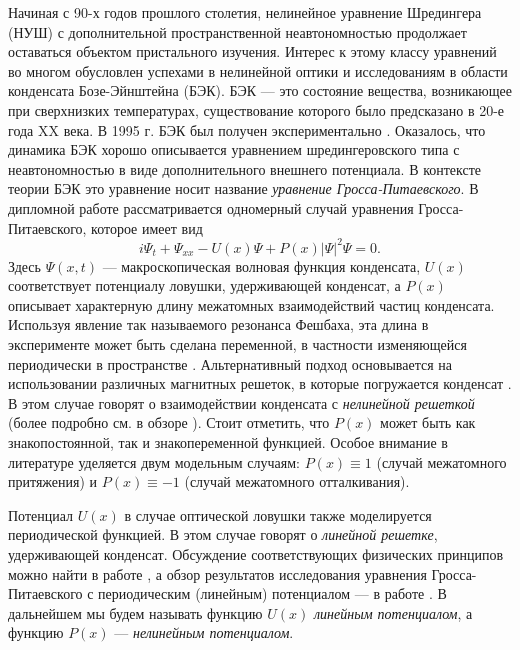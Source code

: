 \intro


Начиная с 90-х годов прошлого столетия, нелинейное уравнение Шредингера (НУШ) с дополнительной пространственной неавтономностью продолжает оставаться объектом пристального изучения.
Интерес к этому классу уравнений во многом обусловлен успехами в нелинейной оптики и исследованиям в области конденсата Бозе-Эйнштейна (БЭК).
БЭК --- это состояние вещества, возникающее при сверхнизких температурах, существование которого было предсказано в 20-е года XX века.
В 1995 г. БЭК был получен экспериментально \cite{Anderson}.
Оказалось, что динамика БЭК хорошо описывается уравнением шредингеровского типа с неавтономностью в виде дополнительного внешнего потенциала.
В контексте теории БЭК это уравнение носит название {\it уравнение Гросса-Питаевского}.
В дипломной работе рассматривается одномерный случай уравнения Гросса-Питаевского, которое имеет вид
%
\begin{equation}
i \Psi_t + \Psi_{xx} - U(x)\Psi + P(x)|\Psi|^2 \Psi = 0.
\label{eq:GPE}
\end{equation}
%
Здесь $\Psi(x, t)$ --- макроскопическая волновая функция конденсата, $U(x)$ соответствует потенциалу ловушки, удерживающей конденсат, а $P(x)$ описывает характерную длину межатомных взаимодействий частиц конденсата.
Используя явление так называемого резонанса Фешбаха, эта длина в эксперименте может быть сделана переменной, в частности изменяющейся периодически в пространстве \cite{Theis}.
Альтернативный подход основывается на использовании различных магнитных решеток, в которые погружается конденсат \cite{Jose}.
В этом случае говорят о взаимодействии конденсата с {\it нелинейной решеткой} (более подробно см. в обзоре \cite{Kartashov}).
Стоит отметить, что $P(x)$ может быть как знакопостоянной, так и знакопеременной функцией.
Особое внимание в литературе уделяется двум модельным случаям: $P(x) \equiv 1$ (случай межатомного притяжения) и $P(x) \equiv -1$ (случай межатомного отталкивания).

Потенциал $U(x)$ в случае оптической ловушки также моделируется периодической функцией.
В этом случае говорят о {\it линейной решетке}, удерживающей конденсат.
Обсуждение соответствующих физических принципов можно найти в работе \cite{Pitaevskii}, а обзор результатов исследования уравнения Гросса-Питаевского с периодическим (линейным) потенциалом --- в работе \citep{Brazhnyi}.
В дальнейшем мы будем называть функцию $U(x)$ {\it линейным потенциалом}, а функцию $P(x)$ --- {\it нелинейным потенциалом}.

